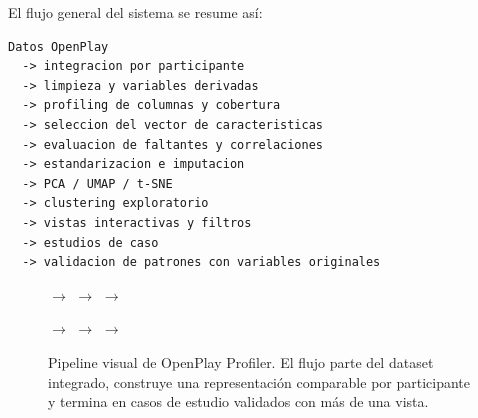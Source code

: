 \documentclass[12pt,a4paper]{article}
\begin{document}
El flujo general del sistema se resume as\'i:

\begin{verbatim}
Datos OpenPlay
  -> integracion por participante
  -> limpieza y variables derivadas
  -> profiling de columnas y cobertura
  -> seleccion del vector de caracteristicas
  -> evaluacion de faltantes y correlaciones
  -> estandarizacion e imputacion
  -> PCA / UMAP / t-SNE
  -> clustering exploratorio
  -> vistas interactivas y filtros
  -> estudios de caso
  -> validacion de patrones con variables originales
\end{verbatim}

\begin{figure}[H]
    \centering
    \small
    $\rightarrow$
    $\rightarrow$
    $\rightarrow$

    \vspace{0.35cm}

    $\rightarrow$
    $\rightarrow$
    $\rightarrow$
    \caption{Pipeline visual de OpenPlay Profiler. El flujo parte del dataset integrado, construye una representaci\'on comparable por participante y termina en casos de estudio validados con m\'as de una vista.}
    \label{fig:pipeline_visual}
\end{figure}
\end{document}
